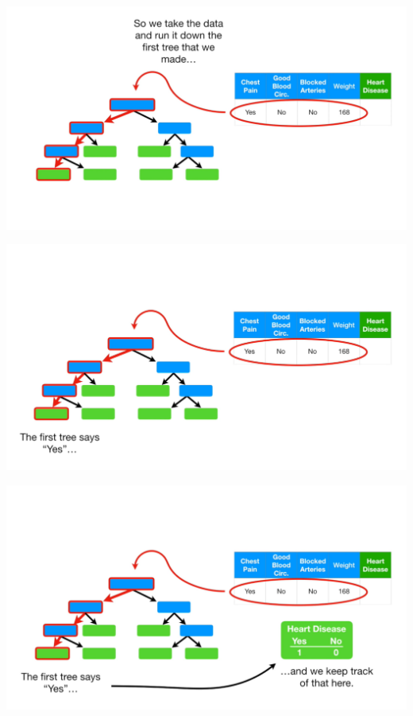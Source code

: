 \documentclass[
  ignorenonframetext,
]{beamer}
\begin{document}
\begin{frame}{}
\protect\hypertarget{section-50}{}
\includegraphics{images/r51.png}
\end{frame}

\begin{frame}{}
\protect\hypertarget{section-51}{}
\includegraphics{images/r52.png}
\end{frame}

\begin{frame}{}
\protect\hypertarget{section-52}{}
\includegraphics{images/r53.png}
\end{frame}
\end{document}
